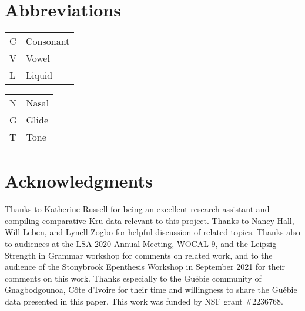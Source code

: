 \documentclass[output=paper,colorlinks,citecolor=brown]{langscibook}
\begin{document}


\section*{Abbreviations}
\begin{tabularx}{.45\textwidth}{@{}lQ@{}}
C & Consonant\\
V & Vowel\\
L & Liquid\\
\end{tabularx}
\begin{tabularx}{.45\textwidth}{@{}lQ@{}}
N & Nasal\\
G & Glide\\
T & Tone\\
\end{tabularx}

\section*{Acknowledgments}
Thanks to Katherine Russell for being an excellent research assistant and compiling comparative Kru data relevant to this project. Thanks to Nancy Hall, Will Leben, and Lynell Zogbo for helpful discussion of related topics. Thanks also to audiences at the LSA 2020 Annual Meeting, WOCAL 9, and the Leipzig Strength in Grammar workshop for comments on related work, and to the audience of the Stonybrook Epenthesis Workshop in September 2021 for their comments on this work. Thanks especially to the Guébie community of Gnagbodgounoa, Côte d'Ivoire for their time and willingness to share the Guébie data presented in this paper. This work was funded by NSF grant \#2236768.


{\sloppy\printbibliography[heading=subbibliography,notkeyword=this]}
\end{document}
